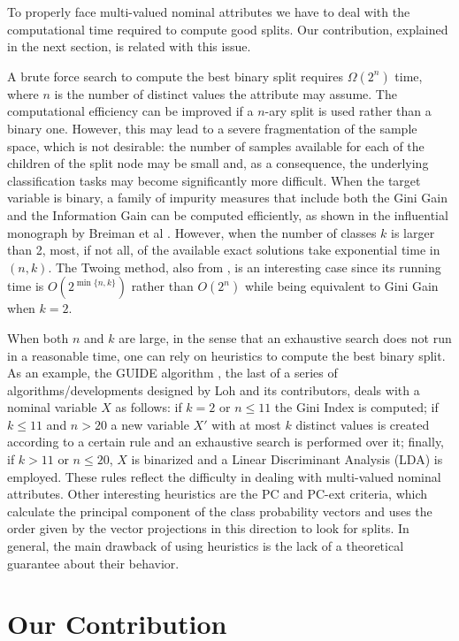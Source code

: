 To properly face  multi-valued nominal attributes we have to deal with the computational time required to compute good splits.
Our contribution, explained in the next section, is related with this issue. 
 
A brute force search to compute the best binary split 
requires $\Omega(2^n)$ time, where $n$ is the number of distinct values the attribute may assume. The computational efficiency can be improved if a $n$-ary split is used rather than a binary one. However,  this may lead to a severe fragmentation of the sample space, which is not desirable: the number of samples available for each of the children of the split node 
may be small and, as a consequence, the underlying classification tasks may become significantly more difficult.
When the target variable is binary, a family of impurity measures that include both the Gini Gain and the Information Gain can be computed efficiently, as shown
in the influential monograph by Breiman et al \cite{Breiman84}.
However, when the number of classes $k$ is larger than 2,
most, if not all, of the available exact solutions take exponential time
in $(n,k)$.
The Twoing method, also from \cite{Breiman84}, 
is an  interesting case since its running time is $O(2^{\min\{n,k\}})$ rather than $O( 2^ n)$ while being equivalent to
Gini Gain when $k=2$.

When both $n$ and $k$ are large, in the sense that an exhaustive search does not run in a reasonable time, one can rely on heuristics to compute the best binary split.
As an example, the GUIDE algorithm  \cite{Loh2009}, the  last
of a series of algorithms/developments designed by Loh and its contributors, 
deals with a nominal variable $X$
as follows: if $k=2$ or $n \le 11$ the Gini Index is computed;
if $k \le 11$ and $n > 20$ a new variable $X'$ with at most $k$ distinct values is created according to a certain rule and an exhaustive search is performed over it;  finally, if $k > 11$ or $n \le 20$,  $X$ is binarized and a Linear Discriminant Analysis (LDA) is employed.
These rules reflect the difficulty in dealing with multi-valued nominal attributes. Other interesting heuristics are the PC and PC-ext criteria, which calculate the principal component of the class probability vectors and uses the order given by the vector projections in this direction to look for splits.
In general, the main drawback of using heuristics is the lack of a theoretical guarantee about their behavior. 


\section{Our Contribution}
\label{sec:contribution}

